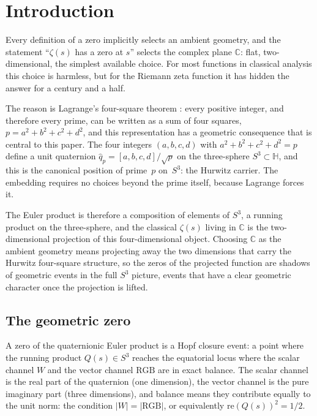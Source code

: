 \documentclass[12pt,a4paper]{article}
\theoremstyle{definition}
\theoremstyle{remark}
\begin{document}
\tableofcontents\newpage

\section{Introduction}

Every definition of a zero implicitly selects an ambient geometry, and the
statement ``$\zeta(s)$ has a zero at $s$'' selects the complex plane
$\mathbb{C}$: flat, two-dimensional, the simplest available choice. For most
functions in classical analysis this choice is harmless, but for the Riemann
zeta function it has hidden the answer for a century and a half.

The reason is Lagrange's four-square theorem \cite{lagrange1770}: every
positive integer, and therefore every prime, can be written as a sum of four
squares, $p = a^2+b^2+c^2+d^2$, and this representation has a geometric
consequence that is central to this paper. The four integers $(a,b,c,d)$
with $a^2+b^2+c^2+d^2 = p$
define a unit quaternion $\hat{q}_p = [a,b,c,d]/\sqrt{p}$ on the three-sphere
$S^3 \subset \mathbb{H}$, and this is the canonical position of prime~$p$
on~$S^3$: the Hurwitz carrier. The embedding requires no choices beyond the
prime itself, because Lagrange forces it.

The Euler product is therefore a composition of elements of $S^3$, a running
product on the three-sphere, and the classical $\zeta(s)$ living in
$\mathbb{C}$ is the two-dimensional projection of this four-dimensional
object. Choosing $\mathbb{C}$ as the ambient geometry means projecting away
the two dimensions that carry the Hurwitz four-square structure, so the zeros
of the projected function are shadows of geometric events in the full $S^3$
picture, events that have a clear geometric character once the projection is
lifted.

\subsection{The geometric zero}

A zero of the quaternionic Euler product is a Hopf closure event: a point
where the running product $Q(s) \in S^3$ reaches the equatorial locus where
the scalar channel $W$ and the vector channel $\mathrm{RGB}$ are in exact
balance. The scalar channel is the real part of the quaternion (one dimension),
the vector channel is the pure imaginary part (three dimensions), and balance
means they contribute equally to the unit norm: the condition
$|W| = |\mathrm{RGB}|$, or equivalently $\mathrm{re}(Q(s))^2 = 1/2$.
\end{document}
